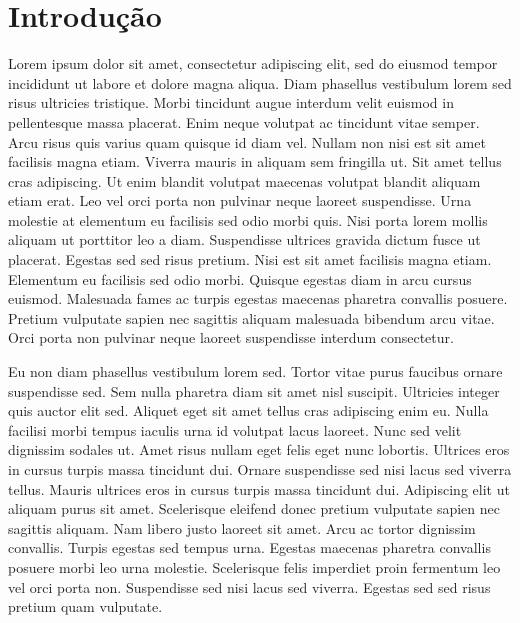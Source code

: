 \documentclass[
  a4paper,
]{report}
\begin{document}
\hypertarget{introduuxe7uxe3o}{%
\chapter{Introdução}\label{introduuxe7uxe3o}}

Lorem ipsum dolor sit amet, consectetur adipiscing elit, sed do eiusmod
tempor incididunt ut labore et dolore magna aliqua. Diam phasellus
vestibulum lorem sed risus ultricies tristique. Morbi tincidunt augue
interdum velit euismod in pellentesque massa placerat. Enim neque
volutpat ac tincidunt vitae semper. Arcu risus quis varius quam quisque
id diam vel. Nullam non nisi est sit amet facilisis magna etiam. Viverra
mauris in aliquam sem fringilla ut. Sit amet tellus cras adipiscing. Ut
enim blandit volutpat maecenas volutpat blandit aliquam etiam erat. Leo
vel orci porta non pulvinar neque laoreet suspendisse. Urna molestie at
elementum eu facilisis sed odio morbi quis. Nisi porta lorem mollis
aliquam ut porttitor leo a diam. Suspendisse ultrices gravida dictum
fusce ut placerat. Egestas sed sed risus pretium. Nisi est sit amet
facilisis magna etiam. Elementum eu facilisis sed odio morbi. Quisque
egestas diam in arcu cursus euismod. Malesuada fames ac turpis egestas
maecenas pharetra convallis posuere. Pretium vulputate sapien nec
sagittis aliquam malesuada bibendum arcu vitae. Orci porta non pulvinar
neque laoreet suspendisse interdum consectetur.

Eu non diam phasellus vestibulum lorem sed. Tortor vitae purus faucibus
ornare suspendisse sed. Sem nulla pharetra diam sit amet nisl suscipit.
Ultricies integer quis auctor elit sed. Aliquet eget sit amet tellus
cras adipiscing enim eu. Nulla facilisi morbi tempus iaculis urna id
volutpat lacus laoreet. Nunc sed velit dignissim sodales ut. Amet risus
nullam eget felis eget nunc lobortis. Ultrices eros in cursus turpis
massa tincidunt dui. Ornare suspendisse sed nisi lacus sed viverra
tellus. Mauris ultrices eros in cursus turpis massa tincidunt dui.
Adipiscing elit ut aliquam purus sit amet. Scelerisque eleifend donec
pretium vulputate sapien nec sagittis aliquam. Nam libero justo laoreet
sit amet. Arcu ac tortor dignissim convallis. Turpis egestas sed tempus
urna. Egestas maecenas pharetra convallis posuere morbi leo urna
molestie. Scelerisque felis imperdiet proin fermentum leo vel orci porta
non. Suspendisse sed nisi lacus sed viverra. Egestas sed sed risus
pretium quam vulputate.
\end{document}
